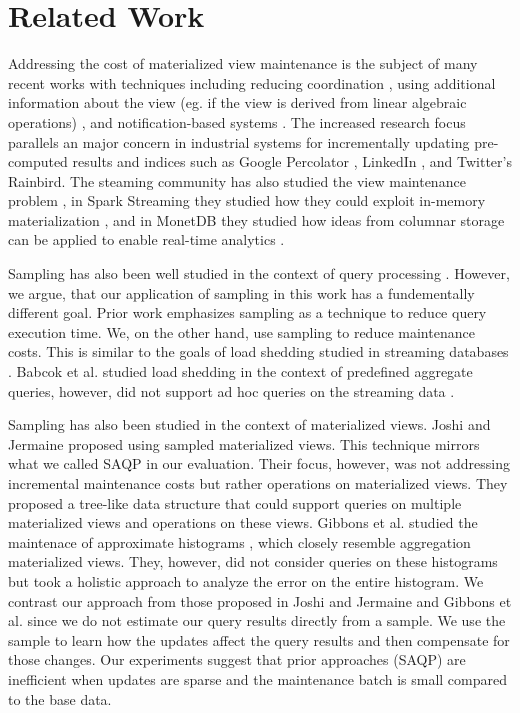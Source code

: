 \section{Related Work}
Addressing the cost of materialized view maintenance is the subject of many recent works with
techniques including reducing coordination \cite{bailis2014scalable}, using additional information about the view (eg. if the view is derived from linear algebraic operations) \cite{nikolic2014linview}, and notification-based systems \cite{percolator}.
The increased research focus parallels an major concern in industrial systems for incrementally updating pre-computed results and indices such as Google Percolator \cite{percolator}, LinkedIn \cite{qiao2013brewing}, and Twitter's Rainbird.
The steaming community has also studied the view maintenance problem \cite{abadi2003aurora,golab2011consistency, golab2012scalable, he2010comet, ghanem2010supporting}, in Spark Streaming they studied how they could exploit in-memory materialization \cite{zaharia2012discretized}, and in MonetDB they studied how ideas from columnar storage can be applied to enable real-time analytics \cite{liarou2012monetdb}.

Sampling has also been well studied in the context of query processing \cite{agarwal2013blinkdb, olken1993random, garofalakis2001approximate}.
However, we argue, that our application of sampling in this work has a fundementally different goal.
Prior work emphasizes sampling as a technique to reduce query execution time.
We, on the other hand, use sampling to reduce maintenance costs.
This is similar to the goals of load shedding studied in streaming databases \cite{tatbul2003load, rabkin2014aggregation}.
Babcok et al. studied load shedding in the context of predefined aggregate queries, however, did not support ad hoc queries on the streaming data \cite{babcock2004load}.

Sampling has also been studied in the context of materialized views.
Joshi and Jermaine \cite{joshi2008materialized} proposed using sampled materialized views.
This technique mirrors what we called SAQP in our evaluation.
Their focus, however, was not addressing incremental maintenance costs but rather operations on materialized views.
They proposed a tree-like data structure that could support queries on multiple materialized views and operations on these views.
Gibbons et al. studied the maintenace of approximate histograms \cite{gibbons1997fast, gibbons1998new}, which closely resemble aggregation materialized views.
They, however, did not consider queries on these histograms but took a holistic approach to analyze the error on the entire histogram.
We contrast our approach from those proposed in Joshi and Jermaine and Gibbons et al. since we do not estimate our query results directly from a sample.
We use the sample to learn how the updates affect the query results and then compensate for those changes.
Our experiments suggest that prior approaches (SAQP) are inefficient when updates are sparse and the maintenance batch is small compared to the base data.

